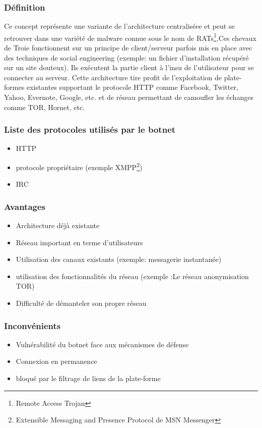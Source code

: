 \subsubsection{Définition}
Ce concept représente une variante de l'architecture centraliséee et peut se retrouver dans une variété de malware connue sous le nom de RATs\footnote{Remote Access Trojan}.Ces chevaux de Troie fonctionnent sur un principe de client/serveur parfois mis en place avec des techniques de social engineering (exemple: un fichier d'installation récupéré sur un site douteux). Ils exécutent la partie client à l'insu de l'utilisateur pour se connecter au serveur.
\newline Cette architecture tire profit de l'exploitation de plate-formes existantes supportant le protocole HTTP comme Facebook, Twitter, Yahoo, Evernote, Google, etc. et de réseau permettant de camoufler les échanges comme TOR, Hornet, etc.

\subsubsection {Liste des protocoles utilisés par le botnet}
\begin{itemize}
	\item HTTP
	\item protocole propriétaire (exemple XMPP\footnote{Extensible Messaging and Presence Protocol de MSN Messenger})
	\item IRC
\end{itemize}

\subsubsection{Avantages}
\begin{itemize}
	\item Architecture déjà existante
	\item Réseau important en terme d'utilisateurs
	\item Utilisation des canaux existants (exemple: messagerie instantanée)
	\item utilisation des fonctionnalités du réseau (exemple :Le réseau anonymisation TOR)
	\item Difficulté de démanteler son propre réseau
\end{itemize}

\subsubsection{Inconvénients}
\begin{itemize}
	\item Vulnérabilité du botnet face aux mécanismes de défense
	\item Connexion en permanence
	\item bloqué par le filtrage de liens de la plate-forme
\end{itemize}

